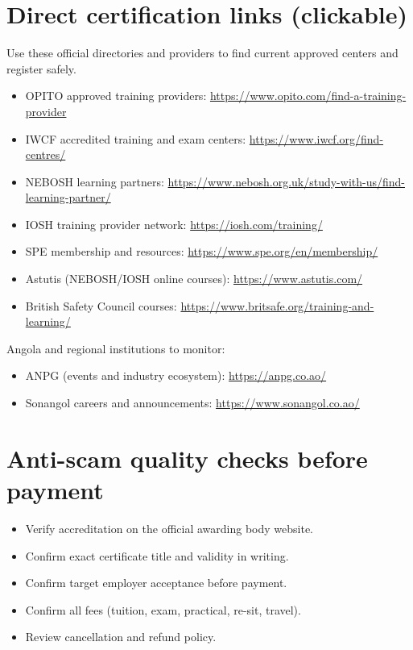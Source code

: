 \documentclass[11pt,openany]{book}
\begin{document}
\section{Direct certification links (clickable)}
Use these official directories and providers to find current approved centers and register safely.

\begin{itemize}
  \item OPITO approved training providers: \url{https://www.opito.com/find-a-training-provider}
  \item IWCF accredited training and exam centers: \url{https://www.iwcf.org/find-centres/}
  \item NEBOSH learning partners: \url{https://www.nebosh.org.uk/study-with-us/find-learning-partner/}
  \item IOSH training provider network: \url{https://iosh.com/training/}
  \item SPE membership and resources: \url{https://www.spe.org/en/membership/}
  \item Astutis (NEBOSH/IOSH online courses): \url{https://www.astutis.com/}
  \item British Safety Council courses: \url{https://www.britsafe.org/training-and-learning/}
\end{itemize}

Angola and regional institutions to monitor:
\begin{itemize}
  \item ANPG (events and industry ecosystem): \url{https://anpg.co.ao/}
  \item Sonangol careers and announcements: \url{https://www.sonangol.co.ao/}
\end{itemize}

\section{Anti-scam quality checks before payment}
\begin{itemize}
  \item Verify accreditation on the official awarding body website.
  \item Confirm exact certificate title and validity in writing.
  \item Confirm target employer acceptance before payment.
  \item Confirm all fees (tuition, exam, practical, re-sit, travel).
  \item Review cancellation and refund policy.
\end{itemize}
\end{document}
